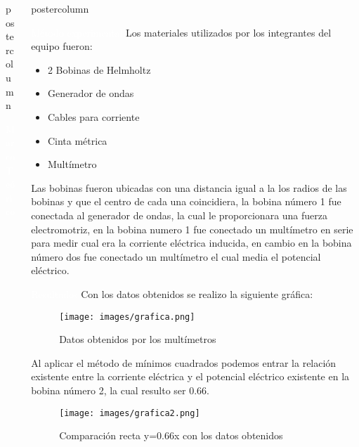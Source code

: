 \documentclass{beamer}
\newlength{\columnheight}
\begin{document}
\begin{frame}
\begin{columns}
\begin{column}{.5\textwidth}
\begin{beamercolorbox}[center]{postercolumn}
\begin{myblock}{\textcolor{white}{Marco Teórico}}
\begin{equation*}
\end{equation*}
\end{myblock}
\end{beamercolorbox}
\end{column}
\begin{column}{.47\textwidth}
\begin{beamercolorbox}[center]{postercolumn}
\begin{minipage}{.98\textwidth} 
\parbox[t][\columnheight]{\textwidth}{
\begin{myblock}{\textcolor{white}{Método experimental}}
Los materiales utilizados por los integrantes del equipo fueron:
\begin{itemize}
\item 2 Bobinas de Helmholtz\\
\item Generador de ondas\\
\item Cables para corriente\\
\item Cinta métrica\\
\item Multímetro
\end{itemize}
Las bobinas fueron ubicadas con una distancia igual a la los radios de las bobinas y que el centro de cada una coincidiera, la bobina número 1 fue conectada al generador de ondas, la cual le proporcionara una fuerza electromotriz, en la bobina numero 1 fue conectado un multímetro en serie para medir cual era la corriente eléctrica inducida, en cambio en la bobina número dos fue conectado un multímetro el cual media el potencial eléctrico.
\end{myblock}
\begin{myblock}{\textcolor{white}{Resultados}}
Con los datos obtenidos se realizo la siguiente gráfica:\\
\begin{center}
\begin{figure}
\texttt{[image: images/grafica.png]}
\caption{Datos obtenidos por los multímetros}
\end{figure}
\end{center}
Al aplicar el método de mínimos cuadrados podemos entrar la relación existente entre la corriente eléctrica y el potencial eléctrico existente en la bobina número 2, la cual resulto ser 0.66.
\begin{center}
\begin{figure}
\texttt{[image: images/grafica2.png]}
\caption{Comparación recta y=0.66x con los datos obtenidos}

\end{figure}
\end{center}
\end{myblock}}
\end{minipage}
\end{beamercolorbox}
\end{column}
\end{columns}
\end{frame}
\end{document}
